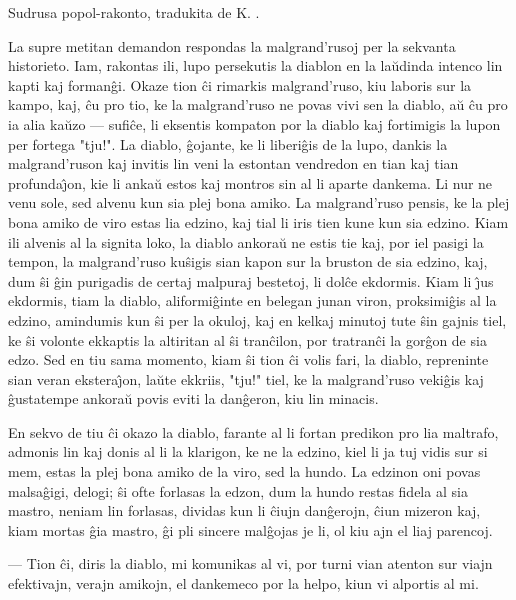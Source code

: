 \begin{center}
\footnotesize Sudrusa popol-rakonto, tradukita de K. .
\end{center}

   La supre metitan demandon respondas la malgrand'rusoj per la
sekvanta historieto. Iam, rakontas ili, lupo persekutis la diablon
en la la\u udinda intenco lin kapti kaj forman\^gi. Okaze tion \^ci
rimarkis malgrand'ruso, kiu laboris sur la kampo, kaj, \^cu pro tio,
ke la malgrand'ruso ne povas vivi sen la diablo, a\u u \^cu pro ia
alia ka\u uzo --- sufi\^ce, li eksentis kompaton por la diablo kaj
fortimigis la lupon per fortega "tju!". La diablo, \^gojante, ke
li liberi\^gis de la lupo, dankis la malgrand'ruson kaj invitis lin
veni la estontan vendredon en tian kaj tian profunda\^{\j}on, kie li
anka\u u estos kaj montros sin al li aparte dankema. Li nur ne venu
sole, sed alvenu kun sia plej bona amiko. La malgrand'ruso pensis,
ke la plej bona amiko de viro estas lia edzino, kaj tial li iris
tien kune kun sia edzino. Kiam ili alvenis al la signita loko, la
diablo ankora\u u ne estis tie kaj, por iel pasigi la tempon, la
malgrand'ruso ku\^sigis sian kapon sur la bruston de sia edzino,
kaj, dum \^si \^gin purigadis de certaj malpuraj bestetoj, li
dol\^ce ekdormis. Kiam li \^{\j}us ekdormis, tiam la diablo,
aliformi\^ginte en belegan junan viron, proksimi\^gis al la edzino,
amindumis kun \^si per la okuloj, kaj en kelkaj minutoj tute \^sin
gajnis tiel, ke \^si volonte ekkaptis la altiritan al \^si
tran\^cilon, por tratran\^ci la gor\^gon de sia edzo. Sed en tiu
sama momento, kiam \^si tion \^ci volis fari, la diablo, repreninte
sian veran ekstera\^{\j}on, la\u ute ekkriis, "tju!" tiel, ke la
malgrand'ruso veki\^gis kaj \^gustatempe ankora\u u povis eviti la
dan\^geron, kiu lin minacis.

   En sekvo de tiu \^ci okazo la diablo, farante al li fortan predikon
pro lia maltrafo, admonis lin kaj donis al li la klarigon, ke ne la
edzino, kiel li ja tuj vidis sur si mem, estas la plej bona amiko de
la viro, sed la hundo. La edzinon oni povas malsa\^gigi, delogi;
\^si ofte forlasas la edzon, dum la hundo restas fidela al sia
mastro, neniam lin forlasas, dividas kun li \^ciujn dan\^gerojn,
\^ciun mizeron kaj, kiam mortas \^gia mastro, \^gi pli sincere
mal\^gojas je li, ol kiu ajn el liaj parencoj.

 --- Tion \^ci, diris la diablo, mi komunikas al vi, por turni vian
atenton sur viajn efektivajn, verajn amikojn, el dankemeco por la
helpo, kiun vi alportis al mi.

\smallrule{}
